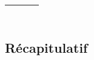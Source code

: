 \documentclass[10pt,oneside]{article}
\begin{document}
\begin{center}
\begin{tabular}{p{} c p{}}
\vspace{3cm}

$\quad$

\\
\hline 
%
\end{tabular}
\end{center}

\newpage


\subsection{Récapitulatif}
\end{document}
